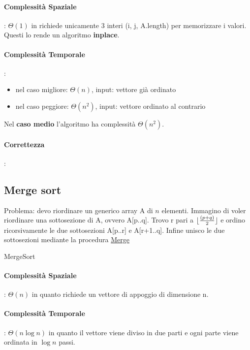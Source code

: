 \documentclass{article}
\DeclarePairedDelimiter\floor{\lfloor}{\rfloor}
\begin{document}
\paragraph{Complessità Spaziale}: $\Theta(1)$ in richiede unicamente 3 interi (i, j, A.length) 
per memorizzare i valori. Questi lo rende un algoritmo \textbf{inplace}.

\paragraph{Complessità Temporale}:
\begin{itemize}
    \item nel caso migliore: $\Theta(n)$, input: vettore già ordinato
    \item nel caso peggiore: $\Theta(n^2)$, input: vettore ordinato al contrario
\end{itemize}
Nel \textbf{caso medio} l'algoritmo ha complessità $\Theta(n^2)$. 
\paragraph{Correttezza}:

\newpage
\hypertarget{mergesort}{}\subsection{Merge sort} %
Problema: devo riordinare un generico array A di $n$ elementi. Immagino di voler riordinare una sottosezione di A, ovvero A[p..q].
Trovo r pari a $ \floor{\frac{(p+q)}{2}}$ e ordino ricorsivamente le due sottosezioni A[p..r] e A[r+1..q]. Infine unisco le due sottosezioni 
mediante la procedura \hyperlink{merge}{Merge}


\begin{algorithm}[H]
\caption{MergeSort}
\end{algorithm}


\paragraph{Complessità Spaziale}: $\Theta(n)$ in quanto richiede un vettore di appoggio di dimensione n.

\paragraph{Complessità Temporale}: $\Theta(n \log n)$ in quanto il vettore viene diviso in due parti e
ogni parte viene ordinata in $\log n$ passi. 
\end{document}
